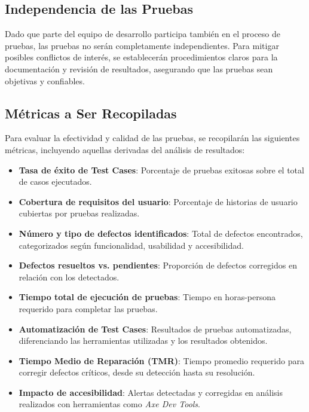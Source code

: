 \documentclass[stu, 12pt, letterpaper, donotrepeattitle, floatsintext, natbib]{apa7}
\begin{document}
\subsection{Independencia de las Pruebas}
Dado que parte del equipo de desarrollo participa también en el proceso de pruebas, las pruebas no serán completamente independientes. Para mitigar posibles conflictos de interés, se establecerán procedimientos claros para la documentación y revisión de resultados, asegurando que las pruebas sean objetivas y confiables.

\subsection{Métricas a Ser Recopiladas}
Para evaluar la efectividad y calidad de las pruebas, se recopilarán las siguientes métricas, incluyendo aquellas derivadas del análisis de resultados:

\begin{itemize}
    \item \textbf{Tasa de éxito de Test Cases}: Porcentaje de pruebas exitosas sobre el total de casos ejecutados.
    \item \textbf{Cobertura de requisitos del usuario}: Porcentaje de historias de usuario cubiertas por pruebas realizadas.
    \item \textbf{Número y tipo de defectos identificados}: Total de defectos encontrados, categorizados según funcionalidad, usabilidad y accesibilidad.
    \item \textbf{Defectos resueltos vs. pendientes}: Proporción de defectos corregidos en relación con los detectados.
    \item \textbf{Tiempo total de ejecución de pruebas}: Tiempo en horas-persona requerido para completar las pruebas.
    \item \textbf{Automatización de Test Cases}: Resultados de pruebas automatizadas, diferenciando las herramientas utilizadas y los resultados obtenidos.
    \item \textbf{Tiempo Medio de Reparación (TMR)}: Tiempo promedio requerido para corregir defectos críticos, desde su detección hasta su resolución.
    \item \textbf{Impacto de accesibilidad}: Alertas detectadas y corregidas en análisis realizados con herramientas como \textit{Axe Dev Tools}.
\end{itemize}
\end{document}
